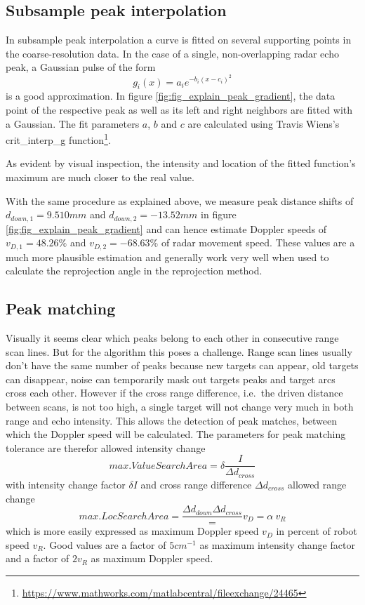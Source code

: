 \subsection{Subsample peak interpolation}\label{subsample-peak-interpolation}

In subsample peak interpolation a curve is fitted on several supporting
points in the coarse-resolution data. In the case of a single,
non-overlapping radar echo peak, a Gaussian pulse of the form
\[g_i(x) = a_i e^{-b_i ( x - c_i )^2}\] is a good approximation. In
figure \cref{fig:fig_explain_peak_gradient}, the data point of the respective peak as well as its left
and right neighbors are fitted with a Gaussian. The fit parameters
\(a\), \(b\) and \(c\) are calculated using Travis
Wiens's crit\_interp\_g function\footnote{\url{https://www.mathworks.com/matlabcentral/fileexchange/24465}}.

As evident by visual inspection, the intensity and location of the
fitted function's maximum are much closer to the real value.

With the same procedure as explained above, we measure peak distance
shifts of \(d_{down,1}=9.510mm\) and \(d_{down,2}=-13.52mm\) in figure
\cref{fig:fig_explain_peak_gradient} and can hence estimate Doppler speeds of \(v_{D,1}=48.26\%\) and
\(v_{D,2}=-68.63\%\) of radar movement speed. These values are a much
more plausible estimation and generally work very well when used to
calculate the reprojection angle in the reprojection method.

\subsection{Peak matching}\label{peak-matching}

Visually it seems clear which peaks belong to each other in consecutive
range scan lines. But for the algorithm this poses a challenge. Range
scan lines usually don't have the same number of peaks because new
targets can appear, old targets can disappear, noise can temporarily
mask out targets peaks and target arcs cross each other. However if the
cross range difference, i.e.~the driven distance between scans, is not
too high, a single target will not change very much in both range and
echo intensity. This allows the detection of peak matches, between which
the Doppler speed will be calculated. The parameters for peak matching
tolerance are therefor allowed intensity change
\[max. ValueSearchArea = \delta \frac{I}{\Delta d_{cross}}\] with
intensity change factor \(\delta I\) and cross range difference
\(\Delta d_{cross}\) allowed range change
\[max. LocSearchArea = \frac{\Delta d_{down}{\Delta d_{cross}}} = v_D = \alpha~v_R\]
which is more easily expressed as maximum Doppler speed \(v_D\) in
percent of robot speed \(v_R\). Good values are a factor of
\(5 cm^{-1}\) as maximum intensity change factor and a factor of
\(2 v_R\) as maximum Doppler speed.


